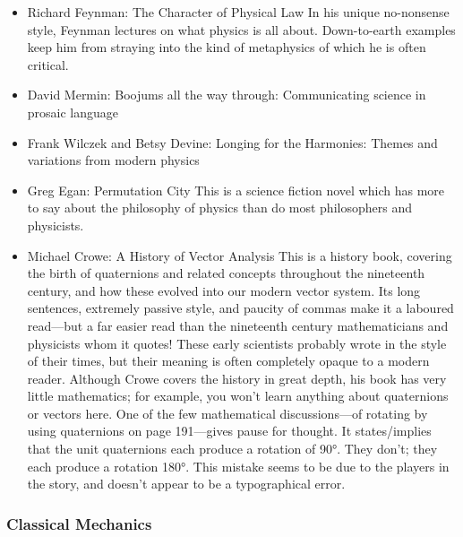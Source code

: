\documentclass[10pt,a4paper]{book}
\theoremstyle{definition}
\begin{document}
\begin{itemize}
\item Richard Feynman: The Character of Physical Law
In his unique no-nonsense style, Feynman lectures on what physics is all about.  Down-to-earth examples keep him from straying into the kind of metaphysics of which he is often critical.
\item David Mermin: Boojums all the way through: Communicating science in prosaic language
\item Frank Wilczek and Betsy Devine: Longing for the Harmonies: Themes and variations from modern physics
\item Greg Egan: Permutation City
This is a science fiction novel which has more to say about the philosophy of physics than do most philosophers and physicists.
\item Michael Crowe: A History of Vector Analysis
This is a history book, covering the birth of quaternions and related concepts throughout the nineteenth century, and how these evolved into our modern vector system.  Its long sentences, extremely passive style, and paucity of commas make it a laboured read—but a far easier read than the nineteenth century mathematicians and physicists whom it quotes!  These early scientists probably wrote in the style of their times, but their meaning is often completely opaque to a modern reader.  Although Crowe covers the history in great depth, his book has very little mathematics; for example, you won't learn anything about quaternions or vectors here.  One of the few mathematical discussions—of rotating by using quaternions on page 191—gives pause for thought.  It states/implies that the unit quaternions each produce a rotation of 90°.  They don't; they each produce a rotation 180°.  This mistake seems to be due to the players in the story, and doesn't appear to be a typographical error.
\end{itemize}


\subsubsection{Classical Mechanics}
\end{document}
